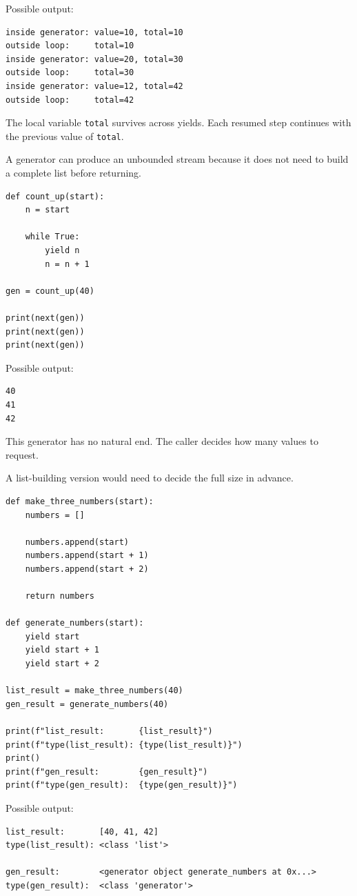Possible output:

\begin{verbatim}
inside generator: value=10, total=10
outside loop:     total=10
inside generator: value=20, total=30
outside loop:     total=30
inside generator: value=12, total=42
outside loop:     total=42
\end{verbatim}

The local variable \texttt{total} survives across yields. Each resumed step continues with the previous value of \texttt{total}.

A generator can produce an unbounded stream because it does not need to build a complete list before returning.

\begin{verbatim}
def count_up(start):
    n = start

    while True:
        yield n
        n = n + 1

gen = count_up(40)

print(next(gen))
print(next(gen))
print(next(gen))
\end{verbatim}

Possible output:

\begin{verbatim}
40
41
42
\end{verbatim}

This generator has no natural end. The caller decides how many values to request.

A list-building version would need to decide the full size in advance.

\begin{verbatim}
def make_three_numbers(start):
    numbers = []

    numbers.append(start)
    numbers.append(start + 1)
    numbers.append(start + 2)

    return numbers

def generate_numbers(start):
    yield start
    yield start + 1
    yield start + 2

list_result = make_three_numbers(40)
gen_result = generate_numbers(40)

print(f"list_result:       {list_result}")
print(f"type(list_result): {type(list_result)}")
print()
print(f"gen_result:        {gen_result}")
print(f"type(gen_result):  {type(gen_result)}")
\end{verbatim}

Possible output:

\begin{verbatim}
list_result:       [40, 41, 42]
type(list_result): <class 'list'>

gen_result:        <generator object generate_numbers at 0x...>
type(gen_result):  <class 'generator'>
\end{verbatim}

